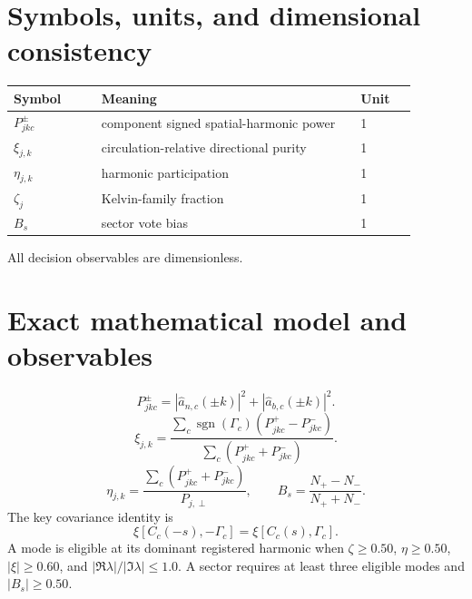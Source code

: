 \documentclass[11pt,a4paper]{article}
\begin{document}
\section{Symbols, units, and dimensional consistency}
\begin{longtable}{p{0.19\linewidth}p{0.57\linewidth}p{0.12\linewidth}}\toprule Symbol&Meaning&Unit\\\midrule
$P_{jkc}^{\pm}$&component signed spatial-harmonic power&1\\$\xi_{j,k}$&circulation-relative directional purity&1\\$\eta_{j,k}$&harmonic participation&1\\$\zeta_j$&Kelvin-family fraction&1\\$B_s$&sector vote bias&1\\\bottomrule\end{longtable}
All decision observables are dimensionless.
\section{Exact mathematical model and observables}
\begin{equation}P_{jkc}^{\pm}=|\widehat a_{n,c}(\pm k)|^2+|\widehat a_{b,c}(\pm k)|^2.\end{equation}
\begin{equation}\xi_{j,k}=\frac{\sum_c\operatorname{sgn}(\Gamma_c)(P_{jkc}^{+}-P_{jkc}^{-})}{\sum_c(P_{jkc}^{+}+P_{jkc}^{-})}.\end{equation}
\begin{equation}\eta_{j,k}=\frac{\sum_c(P_{jkc}^{+}+P_{jkc}^{-})}{P_{j,\perp}},\qquad B_s=\frac{N_+-N_-}{N_++N_-}.\end{equation}
The key covariance identity is
\begin{equation}\xi[C_c(-s),-\Gamma_c]=\xi[C_c(s),\Gamma_c].\end{equation}
A mode is eligible at its dominant registered harmonic when $\zeta\ge0.50$, $\eta\ge0.50$, $|\xi|\ge0.60$, and $|\Re\lambda|/|\Im\lambda|\le1.0$. A sector requires at least three eligible modes and $|B_s|\ge0.50$.
\end{document}

